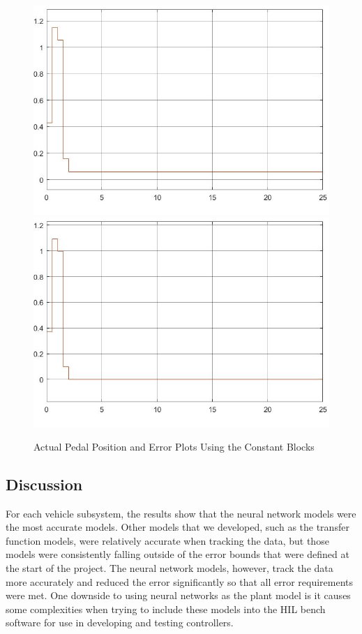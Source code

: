 \documentclass[journal,twoside,web]{ieeecolor}
\begin{document}
\begin{figure}[h]
	\centering
		{\includegraphics[width=0.48\linewidth]{figs/img/brakeSysActualPedalPositionConstantBlocks}}
		{\includegraphics[width=0.48\linewidth]{figs/img/brakeSysPedalPositionErrorConstantBlocks}}
	\caption{Actual Pedal Position and Error Plots Using the Constant Blocks}
\end{figure}


\subsection{Discussion}
\label{sec:discussion}

For each vehicle subsystem, the results show that the neural network models were the most accurate models. Other models that we developed, such as the transfer function models, were relatively accurate when tracking the data, but those models were consistently falling outside of the error bounds that were defined at the start of the project. The neural network models, however, track the data more accurately and reduced the error significantly so that all error requirements were met. One downside to using neural networks as the plant model is it causes some complexities when trying to include these models into the HIL bench software for use in developing and testing controllers. 
\end{document}
